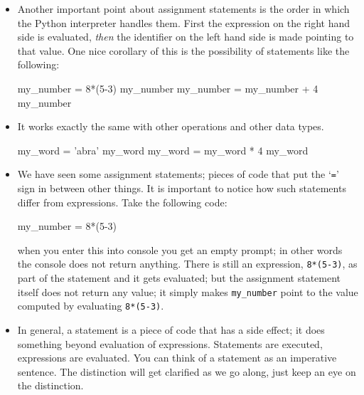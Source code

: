 \documentclass[a4paper]{article}
\begin{document}
\begin{itemize}
\item Another important point about assignment statements is the order in which
the Python interpreter handles them. First the expression on the right hand side
is evaluated, \emph{then} the identifier on the left hand side is made pointing
to that value. One nice corollary of this is the possibility of statements like
the following:


\begin{ucodeframe}
\begin{pyconsole}
my_number = 8*(5-3) 
my_number
my_number = my_number + 4 
my_number
\end{pyconsole}
\end{ucodeframe}

\item It works exactly the same with other operations and other data types.

\begin{ucodeframe}
\begin{pyconsole}
my_word = 'abra' 
my_word
my_word = my_word * 4 
my_word
\end{pyconsole}
\end{ucodeframe}

\item We have seen some assignment statements;  pieces of
code that put the `\Verb+=+' sign in between other things. It is important to
notice how such statements differ from expressions. Take the following code:


\begin{ucodeframe}
\begin{pyconsole}
my_number = 8*(5-3) 
\end{pyconsole}
\end{ucodeframe}

when you enter this into console you get an empty prompt; in other words the
console does not return anything. There is still an expression,
\Verb+8*(5-3)+, as part of the
statement and it gets evaluated; but the assignment statement itself
does not return any value; it simply makes \Verb+my_number+ point to the value
computed by evaluating \Verb+8*(5-3)+.

\item In general, a statement is a piece of code that has a side effect; it does
something beyond evaluation of expressions. Statements are executed, expressions
are evaluated. You can think of a statement as an imperative sentence. The distinction will get clarified as we go along, just keep an
eye on the distinction.

\end{itemize}
\end{document}
